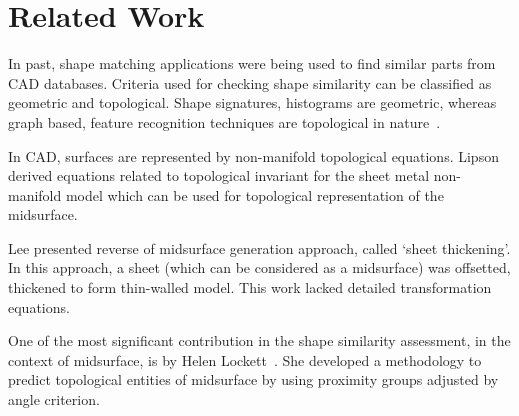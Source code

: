 \section{Related Work}

In past, shape matching applications were being used to find similar parts from CAD databases. Criteria used for checking shape similarity can be classified as geometric and topological. Shape signatures, histograms are geometric, whereas graph based, feature recognition techniques are topological in nature~\cite{Lockett2008}.
%

In CAD, surfaces are represented by non-manifold topological equations. Lipson \cite{Lipson} derived equations related to topological invariant for the sheet metal non-manifold model which can be used for topological representation of the midsurface.

Lee \cite{SHLee2001} presented reverse of midsurface generation approach, called `sheet thickening'. In this approach, a sheet (which can be considered as a midsurface) was offsetted, thickened to form thin-walled model. This work lacked detailed transformation equations.

One of the most significant contribution in the shape similarity assessment, in the context of midsurface, is by Helen Lockett~\cite{Lockett2008}. She developed a methodology to predict topological entities of midsurface by using proximity groups adjusted by angle criterion.


